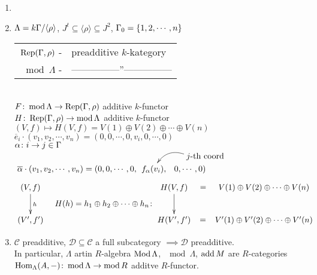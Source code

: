 \begin{exam}
\begin{enumerate}
\item[]
\item $\Lambda = k\Gamma / \langle \rho \rangle$, $J^t \subseteq \langle \rho \rangle \subseteq J^2$, $\Gamma_0 = \{ 1,2,\cdots, n \}$\\
\begin{tabular}{rl}
$\operatorname{Rep}(\Gamma, \rho)$ -& preadditive $k$-kategory\\
$\mod\Lambda$ -& ---------------''---------------
\end{tabular}\\
$F\colon \operatorname{mod}\nolimits\Lambda \to \operatorname{Rep}(\Gamma, \rho)$ additive $k$-functor\\
$H\colon \operatorname{Rep}(\Gamma, \rho) \to \operatorname{mod}\nolimits\Lambda$ additive $k$-functor\\
$(V, f) \mapsto H(V,f) = V(1) \oplus V(2) \oplus \cdots \oplus V(n)$\\
$\overline{e}_i \cdot (v_1, v_2, \cdots, v_n) = (0,0, \cdots, 0, v_i, 0, \cdots, 0)$\\
$\alpha\colon  i \to j \in \Gamma$\\
$\xymatrix@C-2pc@R-2pc{
 && *+[r]{j\text{-th coord}}\ar@/_1pc/[dl]\\
\overline{\alpha}\cdot (v_1, v_2, \cdots, v_n) = (0,0, \cdots, 0,& f_\alpha(v_i), & 0, \cdots, 0)
}$\\
\[\vcenter{\xymatrix{
(V,f) \ar[d]^h\\
(V', f')
}}
\;\;\;\;
H(h) = h_1 \oplus h_2 \oplus \cdots \oplus h_n\colon  \vcenter{\xymatrix{
H(V,f) \ar@{}[r]|-*[@]{=} \ar[d] & V(1) \oplus V(2) \oplus \cdots \oplus V(n)\\
H(V',f') \ar@{}[r]|-*[@]{=} & V'(1) \oplus V'(2) \oplus \cdots \oplus V'(n)\\
}}\]


\item $\mathcal{C}$ preadditive, $\mathcal{D} \subseteq \mathcal{C}$ a full subcategory $\implies \mathcal{D}$ preadditive.\\
In particular, $\Lambda$ artin $R$-algebra $\operatorname{Mod} \Lambda$, $\mod \Lambda$, $\operatorname{add} M$ are $R$-categories\\
$\operatorname{Hom}_\Lambda(A, -)\colon  \operatorname{mod}\nolimits\Lambda \to \operatorname{mod}\nolimits R$ additve $R$-functor.

\end{enumerate}
\end{exam}

